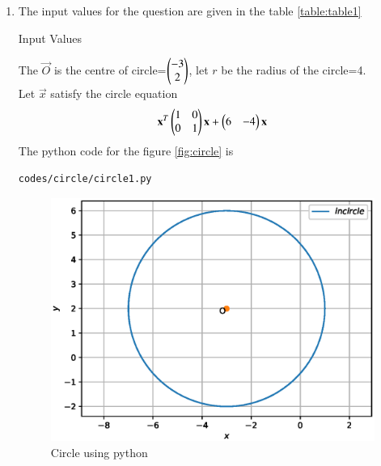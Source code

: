 \renewcommand{\theequation}{\theenumi}
\begin{enumerate}[label=\arabic*.,ref=\thesubsection.\theenumi]
 
\item The input values for the question are given in the table \eqref{table:table1}
\begin{table}[ht!]
\centering

\caption{Input Values}
\label{table:table1}	
\end{table}
The $\vec{O}$ is the centre of circle=$\begin{pmatrix}-3\\2\end{pmatrix}$, let $r$ be the radius of the circle=4.
\\
Let $\vec{x}$ satisfy the circle equation
\begin{align}
\mathbf{x}^T\begin{pmatrix}1&0\\0&1\end{pmatrix}\mathbf{x}+\begin{pmatrix}6&-4\end{pmatrix}\mathbf{x}
\end{align}
The python code for the figure \eqref{fig:circle} is
\begin{lstlisting}
codes/circle/circle1.py
\end{lstlisting}
\begin{figure}[!ht]
\centering
\includegraphics[width=\columnwidth]{./figs/circle/circle1.eps}
\caption{Circle using python}
\label{fig:circle}
\end{figure}

\end{enumerate}